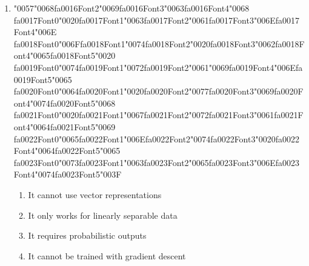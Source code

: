 \documentclass[12pt]{article}
\begin{document}
\begin{enumerate}[label=Q\arabic*.]
\item {\char"0057}{\char"0068}{\csname fa0016Font2\endcsname\char"0069}{\csname fa0016Font3\endcsname\char"0063}{\csname fa0016Font4\endcsname\char"0068} {\csname fa0017Font0\endcsname\char"0020}{\csname fa0017Font1\endcsname\char"0063}{\csname fa0017Font2\endcsname\char"0061}{\csname fa0017Font3\endcsname\char"006E}{\csname fa0017Font4\endcsname\char"006E} {\csname fa0018Font0\endcsname\char"006F}{\csname fa0018Font1\endcsname\char"0074}{\csname fa0018Font2\endcsname\char"0020}{\csname fa0018Font3\endcsname\char"0062}{\csname fa0018Font4\endcsname\char"0065}{\csname fa0018Font5\endcsname\char"0020} {\csname fa0019Font0\endcsname\char"0074}{\csname fa0019Font1\endcsname\char"0072}{\csname fa0019Font2\endcsname\char"0061}{\char"0069}{\csname fa0019Font4\endcsname\char"006E}{\csname fa0019Font5\endcsname\char"0065} {\csname fa0020Font0\endcsname\char"0064}{\csname fa0020Font1\endcsname\char"0020}{\csname fa0020Font2\endcsname\char"0077}{\csname fa0020Font3\endcsname\char"0069}{\csname fa0020Font4\endcsname\char"0074}{\csname fa0020Font5\endcsname\char"0068} {\csname fa0021Font0\endcsname\char"0020}{\csname fa0021Font1\endcsname\char"0067}{\csname fa0021Font2\endcsname\char"0072}{\csname fa0021Font3\endcsname\char"0061}{\csname fa0021Font4\endcsname\char"0064}{\csname fa0021Font5\endcsname\char"0069} {\csname fa0022Font0\endcsname\char"0065}{\csname fa0022Font1\endcsname\char"006E}{\csname fa0022Font2\endcsname\char"0074}{\csname fa0022Font3\endcsname\char"0020}{\csname fa0022Font4\endcsname\char"0064}{\csname fa0022Font5\endcsname\char"0065} {\csname fa0023Font0\endcsname\char"0073}{\csname fa0023Font1\endcsname\char"0063}{\csname fa0023Font2\endcsname\char"0065}{\csname fa0023Font3\endcsname\char"006E}{\csname fa0023Font4\endcsname\char"0074}{\csname fa0023Font5\endcsname\char"003F}
\begin{enumerate}[label=(\Alph*)]
    \item It cannot use vector representations
    \item It only works for linearly separable data
    \item It requires probabilistic outputs
    \item It cannot be trained with gradient descent
\end{enumerate}

\end{enumerate}
\end{document}

